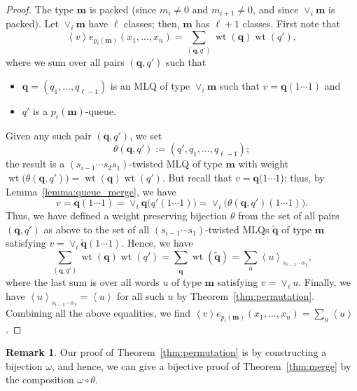 \documentclass[reqno]{amsart}
\newcommand{\0}{\phantom{c}}
\newcommand{\swt}[1]{\left\langle #1 \right\rangle} %
\newcommand{\merge}[1]{\vee_{#1}} %
\DeclareMathOperator{\wt}{wt} %
\newcommand{\mm}{\mathbf{m}}
\newcommand{\qq}{\mathbf{q}}
\let\sumnonlimits\sum
\renewcommand{\sum}{\sumnonlimits\limits}
\newcommand{\tup}[1]{\left( #1 \right)}
\theoremstyle{plain}
\theoremstyle{definition}
\newtheorem{remark}[thm]{Remark}
\numberwithin{equation}{section}
\begin{document}
\begin{proof}
  The type $\mm$ is packed (since $m_i \neq 0$ and $m_{i+1} \neq 0$,
  and since $\merge{i}\mm$ is packed).
  Let $\merge{i}\mm$ have $\ell$ classes; then, $\mm$ has $\ell+1$
  classes.
  First note that
  \[
  \swt{v} e_{p_i(\mm)}(x_1, \dotsc, x_n) = \sum_{(\qq,q')} \wt(\qq) \wt(q'),
  \]
  where we sum over all pairs $(\qq, q')$ such that
  \begin{itemize}
  \item $\qq = (q_1, \dotsc, q_{\ell-1})$ is an MLQ of type $\merge{i}\mm$ such that $v = \qq(1\dotsm 1)$ and
  \item $q'$ is a $p_i(\mm)$-queue.
  \end{itemize}
  Given any such pair $\tup{\qq, q'}$, we set
  \[
  \theta(\qq, q') := (q', q_1, \dotsc, q_{\ell-1});
  \]
  the result is a $(s_{i-1} \dotsm s_2 s_1)$-twisted MLQ of type $\mm$ with weight
  $\wt\bigl( \theta(\qq, q') \bigr) = \wt(\qq) \wt(q')$.
  But recall that $v = \qq(1 \dotsm 1$); thus, by Lemma~\ref{lemma:queue_merge}, we have
  \[
  v = \qq(1 \dotsm 1) = \merge{i} \qq\bigl( q'(1 \dotsm 1) \bigr) = \merge{i} \bigl( \theta(\qq, q')(1 \dotsm 1) \bigr).
  \]
  Thus, we have defined a weight preserving bijection $\theta$ from the set of all pairs $(\qq, q')$ as above
  to the set of all $(s_{i-1} \dotsm s_1)$-twisted MLQs $\widetilde{\qq}$ of type $\mm$ satisfying $v = \merge{i} \widetilde{\qq} \tup{1 \dotsm 1}$.
  Hence, we have
  \[
  \sum_{(\qq,q')} \wt(\qq) \wt(q')
  = \sum_{\widetilde{\qq}} \wt(\widetilde{\qq})
  = \sum_u \swt{u}_{s_{i-1} \dotsm s_1} ,
  \]
  where the last sum is over all words $u$ of type $\mm$ satisfying $v = \merge{i} u$.
  Finally, we have $\swt{u}_{s_{i-1} \dotsm s_1} = \swt{u}$ for all such $u$ by Theorem~\ref{thm:permutation}.
  Combining all the above equalities, we find $\swt{v} e_{p_i(\mm)}(x_1, \dotsc, x_n) = \sum_u \swt{u}$.
\end{proof}

\begin{remark}
\label{rmk:bijective_proof}
Our proof of Theorem~\ref{thm:permutation} is by constructing a bijection $\omega$, and hence, we can give a bijective proof of Theorem~\ref{thm:merge} by the composition $\omega \circ \theta$.
\end{remark}
\end{document}
